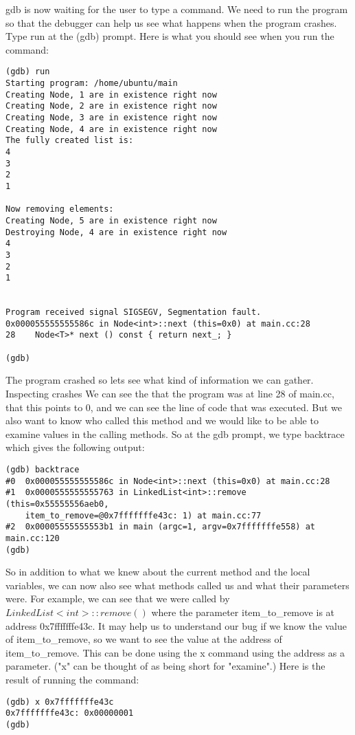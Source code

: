 gdb is now waiting for the user to type a command. We need to run the program so that the debugger can help us see what happens when the program crashes. Type run at the (gdb) prompt. Here is what you should see when you run the command:
\begin{verbatim}
(gdb) run
Starting program: /home/ubuntu/main 
Creating Node, 1 are in existence right now
Creating Node, 2 are in existence right now
Creating Node, 3 are in existence right now
Creating Node, 4 are in existence right now
The fully created list is:
4
3
2
1

Now removing elements:
Creating Node, 5 are in existence right now
Destroying Node, 4 are in existence right now
4
3
2
1


Program received signal SIGSEGV, Segmentation fault.
0x000055555555586c in Node<int>::next (this=0x0) at main.cc:28
28	  Node<T>* next () const { return next_; }

(gdb)
\end{verbatim}
The program crashed so lets see what kind of information we can gather.
Inspecting crashes
We can see the that the program was at line 28 of main.cc, that this points to 0, and we can see the line of code that was executed. But we also want to know who called this method and we would like to be able to examine values in the calling methods. So at the gdb prompt, we type backtrace which gives the following output:

\begin{verbatim}
(gdb) backtrace 
#0  0x000055555555586c in Node<int>::next (this=0x0) at main.cc:28
#1  0x0000555555555763 in LinkedList<int>::remove (this=0x55555556aeb0, 
    item_to_remove=@0x7fffffffe43c: 1) at main.cc:77
#2  0x00005555555553b1 in main (argc=1, argv=0x7fffffffe558) at main.cc:120
(gdb)

\end{verbatim}
So in addition to what we knew about the current method and the local variables, we can now also see what methods called us and what their parameters were. For example, we can see that we were called by $LinkedList<int>::remove ()$ where the parameter item\_to\_remove is at address 0x7fffffffe43c. It may help us to understand our bug if we know the value of item\_to\_remove, so we want to see the value at the address of item\_to\_remove. This can be done using the x command using the address as a parameter. ("x" can be thought of as being short for "examine".) Here is the result of running the command:

\begin{verbatim}
(gdb) x 0x7fffffffe43c
0x7fffffffe43c:	0x00000001
(gdb)
\end{verbatim}

